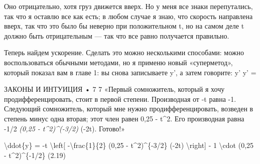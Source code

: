 \documentclass[10pt,oneside]{article}
\begin{document}
Оно отрицательно, хотя груз движется вверх. Но у меня все знаки перепутались, так что я оставлю все как есть; в любом случае я знаю, что скорость направлена вверх, так что это было бы неверно при положительном t, но на самом деле t должно быть отрицательным --- так что все равно получается правильно.\par

Теперь найдем ускорение. Сделать это можно несколькими способами: можно воспользоваться обычными методами, но я применю новый «суперметод», который показал вам в главе 1: вы снова записываете y', а затем говорите: y' y' =\par

ЗАКОНЫ И ИНТУИЦИЯ • 7 7 «Первый сомножитель, который я хочу продифференцировать, стоит в первой степени. Производная от -t равна -1. Следующий сомножитель, который мне нужно продифференцировать, возведен в степень минус одна вторая; этот член равен 0,25 - t\textasciicircum{}2. Его производная равна -1/2 \emph{ (0,25 - t\textasciicircum{}2)\textasciicircum{}(-3/2) } (-2t). Готово!»\par

\textbackslash{}ddot\{y\} = -t \textbackslash{}left[ -\textbackslash{}frac\{1\}\{2\} (0,25 - t\textasciicircum{}2)\textasciicircum{}\{-3/2\} (-2t) \textbackslash{}right] - 1 \textbackslash{}cdot (0,25 - t\textasciicircum{}2)\textasciicircum{}\{-1/2\} (2.19)\par
\end{document}
